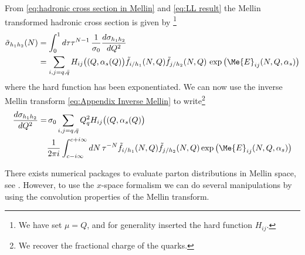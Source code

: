 From \cref{eq:hadronic cross section in Mellin} and \cref{eq:LL result} the Mellin transformed hadronic cross section is given by \footnote{We have set $\mu=Q$, and for generality inserted the hard function $H_{ij}$.}
\begin{align}
    \tilde{\sigma}_{h_1h_2}(N)&=\int_{0}^{1}d\tau \tau^{N-1}\,\frac{1}{\sigma_{0}}\frac{d\sigma_{h_1h_2}}{dQ^{2}}\nonumber
    \\
    &=\sum_{i,j=q,\bar{q}}H_{ij}\big((Q,\alpha_{s}(Q)\big)\tilde{f}_{i/h_1}(N,Q)\tilde{f}_{j/h_2}(N,Q)\,\exp\big(\Me{E}_{ij}(N,Q,\alpha_s)\big)
\end{align}
where the hard function has been exponentiated. We can now use the inverse Mellin transform \cref{eq:Appendix Inverse Mellin} to write\footnote{We recover the fractional charge of the quarks.}
\begin{align}
    \frac{d\sigma_{h_1h_2}}{dQ^{2}}=&\,\sigma_{0}\sum_{i,j=q,\bar{q}}Q_{q}^{2}H_{ij}\big((Q,\alpha_{s}(Q)\big)\nonumber
    \\
    &\frac{1}{2\pi i}\int_{c-i\infty}^{c+i\infty}dN\,\tau^{-N}\tilde{f}_{i/h_1}(N,Q)\tilde{f}_{j/h_2}(N,Q)\exp\big(\Me{E}_{ij}(N,Q,\alpha_s)\big)
\end{align}

There exists numerical packages to evaluate parton distributions in Mellin space, see \cite{Vogt_2005}. However, to use the $x$-space formalism we can do several manipulations by using the convolution properties of the Mellin transform.


